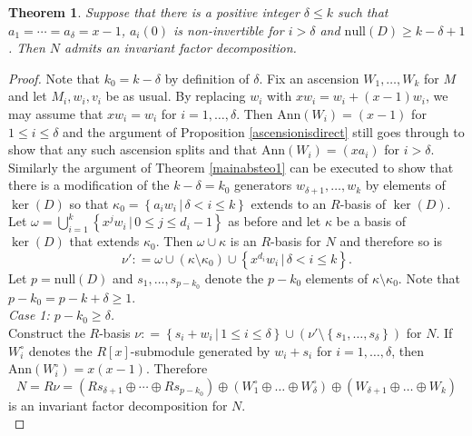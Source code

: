 \documentclass[11pt]{article}
\newtheorem{theorem}[theo]{Theorem}
\theoremstyle{definition}
\numberwithin{equation}{section}
\begin{document}
\begin{theorem}  \label{mainabsteo2}  Suppose that there  is  a positive integer  $ \delta   \leq  k    $ such that $ a_{1} = \cdots = a_{\delta} = x-1 $, $ a_{i}(0) $ is non-invertible for $ i > \delta $     and $  \mathrm{null}   (D) \geq k - \delta + 1 $.    Then $ N $ admits an invariant  factor   decomposition.    
\end{theorem}    

\begin{proof} Note that $k_0 = k - \delta$ by definition of $\delta$. Fix an ascension $ W_{1}, \ldots, W_{k} $ for $ M $ and let $ M_{i}, w_{i}, v_{i} $ be as  usual.  By replacing $ w_{i} $ with $ x w_{i} = w_{i} + (x-1)w_{i}  $, we may assume that $ x w_{i} = w_{i}  $ for $ i = 1, \ldots, \delta $. Then $ \mathrm{Ann}(W_{i}) = (x-1) $ for $1 \leq  i \leq \delta $ and the argument of Proposition \ref{ascensionisdirect} still goes through  to show that any such  ascension   splits and that $ \mathrm{Ann}(W_{i}) = ( x a_{i} ) $ for $ i > \delta $.   Similarly the argument of Theorem \ref{mainabsteo1} can be executed to show that there is a modification of  the $   k - \delta  =  k_{0}     $ generators $ w_{\delta+1} , \ldots, w_{k} $ by elements of $ \ker(D) $ so that  $ \kappa_{0}  =  \left \{ a_{i} w_{i} \, | \, \delta < i \leq k \right \} $ extends to an $R $-basis of $ \ker(D) $. Let $  \omega  = \bigcup_{i=1}^{k} \left \{  x^{j}   w_{i} \, | \, 0 \leq j \leq d_{i} - 1  \right \}  $ as before and let $ \kappa  $  be  a   basis of $ \ker (D ) $ that extends $ \kappa_{0} $. Then $ \omega \cup  \kappa $ is an $ R $-basis for $ N $ and therefore so is $$ \nu '    : = \omega   \cup ( \kappa \setminus \kappa_{0  } )  \cup \left \{ x^{d_{i}    }  w_{i} \, | \, \delta < i \leq k \right \} . $$   Let $ p  =  \mathrm{null} (D)   $ and  $ s_{1}, \ldots, s_{p-k_{0}} $ denote the $ p - k_{0} $  elements of $ \kappa \setminus \kappa_{0} $. Note that $ p - k_{0} = p - k + \delta \geq 1 $. \\

\textit{Case 1: $ p - k_{0} \geq \delta $.} \\

 Construct the $ R $-basis $ \nu : = \left \{  s_{i} +  w_{i} \,  | \,  1 \leq i \leq \delta    \right \} \cup ( \nu' \setminus \left \{  s_{1}, \ldots, s_{\delta} \right \}   )   $ for $ N $. If $ W_{i}^{\circ} $ denotes the $ R[x] $-submodule generated by $ w_{i} + s_{i} $ for $ i = 1 , \ldots, \delta $, then $ \mathrm{Ann}(W_{i}^{\circ}) = x(x-1) $. Therefore  
 $$ N = R \nu =  \left (    R s_{\delta + 1 } \oplus \cdots \oplus R s_{p-k_{0}}  \right   ) \oplus \left (   W_{1}^{\circ} \oplus \ldots  \oplus  W_{\delta}^{\circ}  \right ) \oplus \left ( W_{\delta + 1 } \oplus \ldots      \oplus W_{k} \right )   $$
is an invariant factor decomposition for  $ N $. \\


\end{proof}
\end{document}

